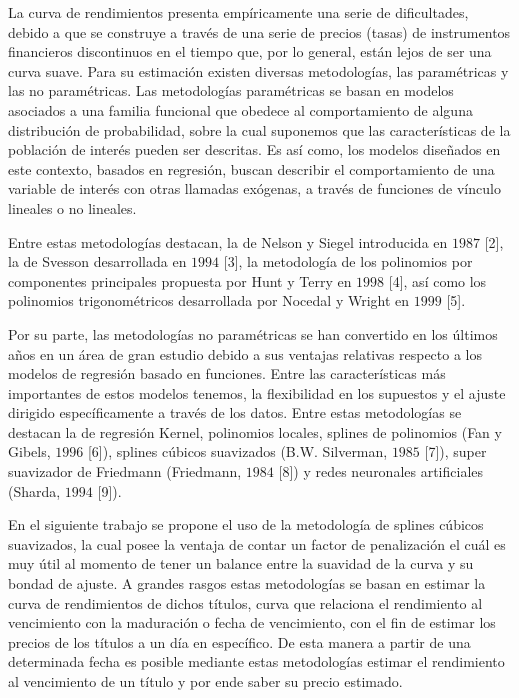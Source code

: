 \vspace{0.5cm}

\hspace*{0.4 cm} La curva de rendimientos presenta emp\'iricamente una serie de dificultades, debido a que se construye a trav\'es de una serie de precios (tasas) de instrumentos financieros discontinuos en el tiempo que, por lo general, est\'an lejos de ser una curva suave. Para su estimaci\'on existen diversas metodolog\'ias, las param\'etricas y las no param\'etricas. Las metodolog\'ias param\'etricas se basan en modelos asociados a una familia funcional que obedece al comportamiento de alguna distribuci\'on de probabilidad, sobre la cual suponemos que las caracter\'isticas de la poblaci\'on de inter\'es pueden ser descritas. Es as\'i como, los modelos dise\~nados en este contexto, basados en regresi\'on, buscan describir el comportamiento de una variable de inter\'es con otras llamadas ex\'ogenas, a trav\'es de funciones de v\'inculo lineales o no lineales.

\vspace{0.5cm}

\hspace*{0.4 cm}Entre estas metodolog\'ias destacan, la de Nelson y Siegel introducida en $1987$ [2], la de Svesson desarrollada en $1994$ [3], la metodolog\'ia de los polinomios por componentes principales propuesta por Hunt y Terry en $1998$ [4], as\'i como los polinomios trigonom\'etricos desarrollada por Nocedal y Wright en $1999$ [5].



\hspace*{0.4 cm} Por su parte, las metodolog\'ias no param\'etricas se han convertido en los \'ultimos a\~nos en un
\'area de gran estudio debido a sus ventajas relativas respecto a los modelos de regresi\'on basado en funciones. Entre las caracter\'isticas m\'as importantes de estos modelos tenemos, la flexibilidad en los supuestos y el ajuste dirigido espec\'ificamente a trav\'es de los datos. Entre estas metodolog\'ias se destacan la de regresi\'on Kernel, polinomios locales, splines de polinomios (Fan y Gibels, $1996$ [6]), splines c\'ubicos suavizados (B.W. Silverman, $1985$ [7]), super suavizador de Friedmann (Friedmann, $1984$ [8]) y redes neuronales artificiales (Sharda, $1994$ [9]).

\vspace{0.5cm}

\hspace*{0.4 cm} En el siguiente trabajo se propone el uso de la metodolog\'ia de splines c\'ubicos suavizados, la cual posee la ventaja de contar un factor de penalizaci\'on el cu\'al es muy \'util al momento de tener un balance entre la suavidad de la curva y su bondad de ajuste. A grandes rasgos estas metodolog\'ias se basan en estimar la curva de rendimientos de dichos t\'itulos, curva que relaciona el rendimiento al vencimiento con la maduraci\'on o fecha de vencimiento, con el fin de estimar los precios de los t\'itulos a un d\'ia en espec\'ifico. De esta manera a partir de una determinada fecha es posible mediante estas metodolog\'ias estimar el rendimiento al vencimiento de un t\'itulo y por ende saber su precio estimado.

